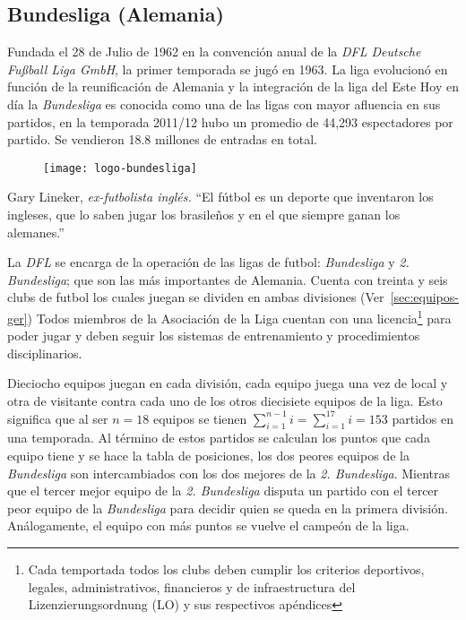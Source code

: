 \subsection{Bundesliga (Alemania)}


Fundada el 28 de Julio de 1962 en la convención anual de la \emph{DFL Deutsche Fußball Liga GmbH}, la primer temporada se jugó en 1963. La liga evolucionó en función de la reunificación de Alemania y la integración de la liga del Este\cite{hesse2003tor} Hoy en día la \emph{Bundesliga} es conocida como una de las ligas con mayor afluencia en sus partidos, en la temporada 2011/12 hubo un promedio de 44,293 espectadores por partido. Se vendieron 18.8 millones de entradas en total.

\begin{figure}[!htb]\centering
   \begin {minipage}{0.4\textwidth}
     \texttt{[image: logo-bundesliga]}
   \end{minipage}
\end{figure}
\begin{chapquote}{Gary Lineker, \textit{ex-futbolista inglés.}}
	``El fútbol es un deporte que inventaron los ingleses, que lo saben jugar los brasileños y en el que siempre ganan los alemanes.''
\end{chapquote}


La \emph{DFL} se encarga de la operación de las ligas de futbol: \emph{Bundesliga} y \emph{2. Bundesliga}; que son las más importantes de Alemania. Cuenta con treinta y seis clubs de futbol los cuales juegan se dividen en ambas divisiones (Ver~\cref{sec:equipos-ger}) Todos miembros de la Asociación  de la Liga cuentan con una licencia\footnote{Cada temportada todos los clubs deben cumplir los criterios deportivos, legales, administrativos, financieros y de infraestructura del Lizenzierungsordnung (LO) y sus respectivos apéndices} para poder jugar y deben seguir los sistemas de entrenamiento y procedimientos disciplinarios.

Dieciocho equipos juegan en cada división, cada equipo juega una vez de local y otra de visitante contra cada uno de los otros diecisiete equipos de la liga. Esto significa que al ser $n=18$ equipos se tienen $\sum\limits_{i=1}^{n-1} i= \sum\limits_{i=1}^{17} i= 153 $ partidos en una temporada. Al término de estos partidos se calculan los puntos que cada equipo tiene y se hace la tabla de posiciones, los dos peores equipos de la \emph{Bundesliga} son intercambiados con los dos mejores de la \emph{2. Bundesliga}. Mientras que el tercer mejor equipo de la \emph{2. Bundesliga} disputa un partido con el tercer peor equipo de la \emph{Bundesliga} para decidir quien se queda en la primera división. Análogamente, el equipo con más puntos se vuelve el campeón de la liga.

